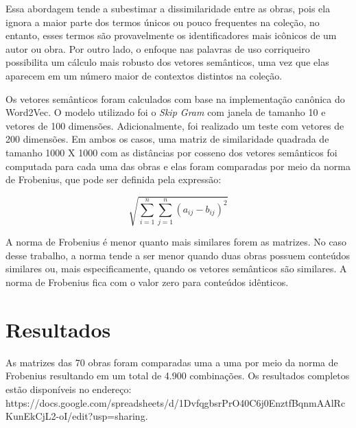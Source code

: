 \documentclass{article}
\begin{document}
Essa abordagem tende a subestimar a dissimilaridade entre as obras, pois ela ignora a maior parte dos
termos únicos ou pouco frequentes na coleção, no entanto, esses termos são provavelmente os identificadores mais
icônicos de um autor ou obra. Por outro lado, o enfoque nas palavras de uso corriqueiro possibilita
um cálculo mais robusto dos vetores semânticos, uma vez que elas aparecem em um número maior de contextos 
distintos na coleção.

Os vetores semânticos foram calculados com base na implementação canônica do Word2Vec. O modelo
utilizado foi o \textit{Skip Gram} com janela de tamanho 10 e vetores de 100 dimensões. Adicionalmente, 
foi realizado um teste com vetores de 200 dimensões. Em ambos os casos, uma matriz de similaridade
quadrada de tamanho 1000 X 1000 com as distâncias por cosseno dos vetores semânticos foi computada para cada
uma das obras e elas foram comparadas por meio da norma de Frobenius, que pode ser definida pela expressão:

\[
\sqrt{\sum_{i = 1}^n\sum_{j = 1}^n (a_{ij} - b_{ij})^2}
\]

A norma de Frobenius é menor quanto mais similares forem as matrizes. No caso desse trabalho, a norma tende a ser menor
quando duas obras possuem conteúdos similares ou, mais especificamente, quando os vetores semânticos são similares. 
A norma de Frobenius fica com o valor zero para conteúdos idênticos.

\section{Resultados}

As matrizes das 70 obras foram comparadas uma a uma por meio da norma de Frobenius resultando em um total de 
4.900 combinações. Os resultados completos estão disponíveis no endereço: \\
https://docs.google.com/spreadsheets/d/1DvfqgbsrPrO40C6j0EnztfBqnmAAlRcKunEkCjL2-oI/edit?usp=sharing.
\end{document}
